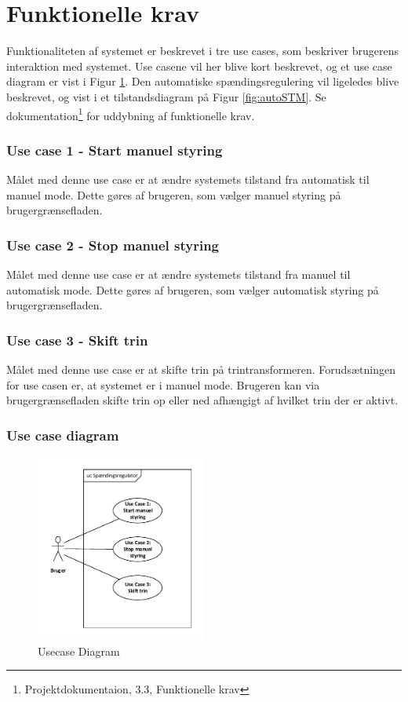 
\section{Funktionelle krav}

Funktionaliteten af systemet er beskrevet i tre use cases, som beskriver brugerens interaktion med systemet. Use casene vil her blive kort beskrevet, og et use case diagram er vist i Figur \ref{fig:UsecaseDiagram}.
 Den automatiske spændingsregulering vil ligeledes blive beskrevet, og vist i et tilstandsdiagram på Figur \ref{fig:autoSTM}.
  Se dokumentation\footnote{Projektdokumentaion, 3.3, Funktionelle krav} for uddybning af funktionelle krav. 

\subsubsection{Use case 1 - Start manuel styring}
Målet med denne use case er at ændre systemets tilstand fra automatisk til manuel mode. Dette gøres af brugeren, som vælger manuel styring på brugergrænsefladen. 

\subsubsection{Use case 2 - Stop manuel styring}
Målet med denne use case er at ændre systemets tilstand fra manuel til automatisk mode. Dette gøres af brugeren, som vælger automatisk styring på brugergrænsefladen. 

\subsubsection{Use case 3 - Skift trin}
Målet med denne use case er at skifte trin på trintransformeren. Forudsætningen for use casen er, at systemet er i manuel mode. Brugeren kan via brugergrænsefladen skifte trin op eller ned afhængigt af hvilket trin der er aktivt. 

\subsubsection{Use case diagram}
\begin{figure}[H] %
	\centering
	\includegraphics[width=0.5\textwidth]{figure/UsecaseDiagram}
	\caption{Usecase Diagram}
	\label{fig:UsecaseDiagram}
\end{figure}

